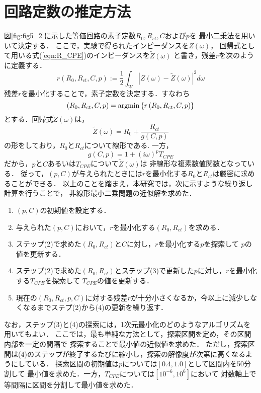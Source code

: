 \section{回路定数の推定方法}
図\ref{fig:fig5_2}に示した等価回路の素子定数$R_0,R_{ct},C$および$p$を
最小二乗法を用いいて決定する．
ここで，実験で得られたインピーダンスを$Z(\omega)$，
回帰式として用いる式(\ref{eqn:R_CPE})のインピーダンスを$\tilde{Z}(\omega)$
と書き，残差$r$を次のように定義する．
\begin{equation}
	r\left(R_0,R_{ct},C,p \right):= \frac{1}{2}\int _{W} \left| Z(\omega)-\tilde{Z}(\omega)\right|^2 d\omega
	\label{eqn:}
\end{equation}
残差$r$を最小化することで，素子定数を決定する．すなわち
\begin{equation}
	\left( R_0, R_{ct}, C,p \right)= {\rm argmin} \left\{ r\left(R_0,R_{ct},C,p \right) \right\}
	\label{eqn:}
\end{equation}
とする．回帰式$\tilde Z(\omega)$は，
\begin{equation}
	\tilde Z (\omega) =R_0+\frac{R_{ct}}{g(C,p)}
	\label{eqn:}
\end{equation}
の形をしており，$R_0$と$R_{ct}$について線形である. 一方，
\begin{equation}
	g(C,p)= 1+(i\omega)^pT_{CPE} 
	\label{eqn:}
\end{equation}
だから，$p$と$C$あるいは$T_{CPE}$について$\tilde {Z}(\omega)$は
非線形な複素数値関数となっている．
従って，$(p,C)$が与えられたときには$r$を最小化する$R_0$と$R_{ct}$は厳密に求めることができる．
以上のことを踏まえ，本研究では，次に示すような繰り返し計算を行うことで，
非線形最小二乗問題の近似解を求めた．
\begin{enumerate}
\item
	$(p,C)$の初期値を設定する．
\item
	与えられた$(p,C)$において，$r$を最小化する$(R_0, R_{ct})$を求める．
\item
	ステップ(2)で求めた$(R_0,R_{ct})$と$C$に対し，$r$を最小化する$p$を探索して
	$p$の値を更新する．
\item
	ステップ(2)で求めた$(R_0,R_{ct})$とステップ(3)で更新した$p$に対し，$r$を最小化する$T_{CPE}$を探索して
	$T_{CPE}$の値を更新する．
\item
	現在の$(R_0,R_{ct},p,C)$に対する残差$r$が十分小さくなるか，今以上に減少しなくなるまでステプ(2)から(4)の更新を繰り返す．
\end{enumerate}
なお，ステップ(3)と(4)の探索には，1次元最小化のどのようなアルゴリズムを用いてもよい．
ここでは，最も単純な方法として，探索区間を定め，その区間内部を一定の間隔で
探索することで最小値の近似値を求めた．
ただし，探索区間は(4)のステップが終了するたびに縮小し，探索の解像度が次第に高くなるようにしている．
探索区間の初期値は$p$については$[0.4,1.0]$として区間内を50分割して
最小値を求めた．一方，$T_{CPE}$については$ [10^{-6}, 10^{6}]$において
対数軸上で等間隔に区間を分割して最小値を求めた．
